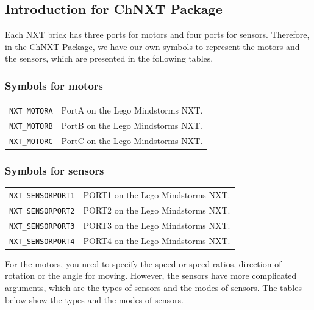 \documentclass[11pt]{article}
\begin{document}
\subsection{\label{sec:basic_intro}Introduction for ChNXT Package}
Each NXT brick has three ports for motors and four ports for sensors.
Therefore, in the ChNXT Package, we have our own symbols to represent the motors
and the sensors, which are presented in the following tables.

\subsubsection*{Symbols for motors}
\begin{longtable}{p{3.5cm}p{12cm}}
\hline 
{\tt NXT\_MOTORA} & PortA on the Lego Mindstorms NXT. \\
{\tt NXT\_MOTORB} & PortB on the Lego Mindstorms NXT. \\
{\tt NXT\_MOTORC} & PortC on the Lego Mindstorms NXT. \\
\hline
\end{longtable}

\newpage
\subsubsection*{Symbols for sensors}
\begin{longtable}{p{3.5cm}p{12cm}}
\hline
{\tt NXT\_SENSORPORT1}&PORT1 on the Lego Mindstorms NXT.\\
{\tt NXT\_SENSORPORT2}&PORT2 on the Lego Mindstorms NXT.\\
{\tt NXT\_SENSORPORT3}&PORT3 on the Lego Mindstorms NXT.\\
{\tt NXT\_SENSORPORT4}&PORT4 on the Lego Mindstorms NXT.\\
\hline
\end{longtable}
For the motors, you need to specify the speed or speed ratios, direction of 
rotation or the angle for moving. However, the sensors have more complicated 
arguments, which are the types of sensors and the modes of sensors. The tables 
below show the types and the modes of sensors.
\end{document}
